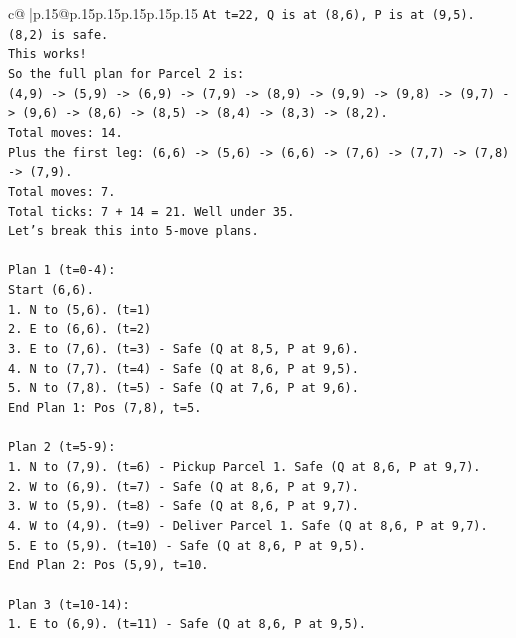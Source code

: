 \documentclass{article}
\begin{document}
{\begin{supertabular}{c@{$\;$}|p{.15\linewidth}@{}p{.15\linewidth}p{.15\linewidth}p{.15\linewidth}p{.15\linewidth}p{.15\linewidth}}
{{{\texttt{At t=22, Q is at (8,6), P is at (9,5). (8,2) is safe.} \\
\texttt{This works!} \\
\texttt{So the full plan for Parcel 2 is:} \\
\texttt{(4,9) {-}> (5,9) {-}> (6,9) {-}> (7,9) {-}> (8,9) {-}> (9,9) {-}> (9,8) {-}> (9,7) {-}> (9,6) {-}> (8,6) {-}> (8,5) {-}> (8,4) {-}> (8,3) {-}> (8,2).} \\
\texttt{Total moves: 14.} \\
\texttt{Plus the first leg: (6,6) {-}> (5,6) {-}> (6,6) {-}> (7,6) {-}> (7,7) {-}> (7,8) {-}> (7,9).} \\
\texttt{Total moves: 7.} \\
\texttt{Total ticks: 7 + 14 = 21. Well under 35.} \\
\texttt{Let's break this into 5{-}move plans.} \\
\\ 
\texttt{Plan 1 (t=0{-}4):} \\
\texttt{Start (6,6).} \\
\texttt{1. N to (5,6). (t=1)} \\
\texttt{2. E to (6,6). (t=2)} \\
\texttt{3. E to (7,6). (t=3) {-} Safe (Q at 8,5, P at 9,6).} \\
\texttt{4. N to (7,7). (t=4) {-} Safe (Q at 8,6, P at 9,5).} \\
\texttt{5. N to (7,8). (t=5) {-} Safe (Q at 7,6, P at 9,6).} \\
\texttt{End Plan 1: Pos (7,8), t=5.} \\
\\ 
\texttt{Plan 2 (t=5{-}9):} \\
\texttt{1. N to (7,9). (t=6) {-} Pickup Parcel 1. Safe (Q at 8,6, P at 9,7).} \\
\texttt{2. W to (6,9). (t=7) {-} Safe (Q at 8,6, P at 9,7).} \\
\texttt{3. W to (5,9). (t=8) {-} Safe (Q at 8,6, P at 9,7).} \\
\texttt{4. W to (4,9). (t=9) {-} Deliver Parcel 1. Safe (Q at 8,6, P at 9,7).} \\
\texttt{5. E to (5,9). (t=10) {-} Safe (Q at 8,6, P at 9,5).} \\
\texttt{End Plan 2: Pos (5,9), t=10.} \\
\\ 
\texttt{Plan 3 (t=10{-}14):} \\
\texttt{1. E to (6,9). (t=11) {-} Safe (Q at 8,6, P at 9,5).} \\
}}}
\end{supertabular}}
\end{document}
